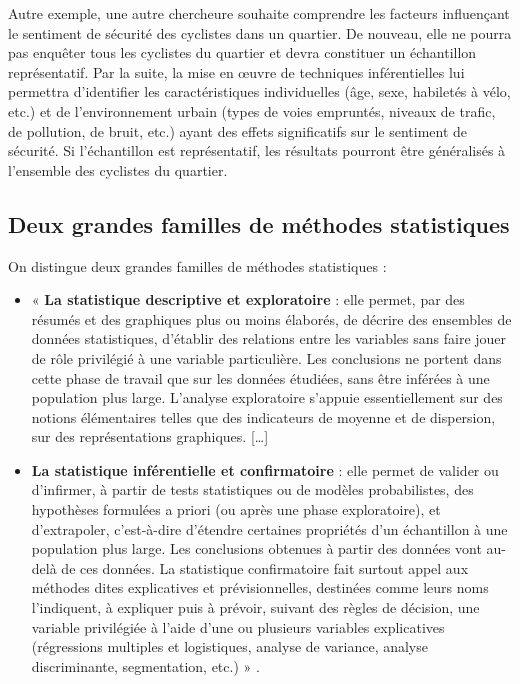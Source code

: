 \documentclass[
  11pt,
  french,
]{book}
\providecommand{\tightlist}{%
  \setlength{\itemsep}{0pt}\setlength{\parskip}{0pt}}
\begin{document}
Autre exemple, une autre chercheure souhaite comprendre les facteurs influençant le sentiment de sécurité des cyclistes dans un quartier. De nouveau, elle ne pourra pas enquêter tous les cyclistes du quartier et devra constituer un échantillon représentatif. Par la suite, la mise en œuvre de techniques inférentielles lui permettra d'identifier les caractéristiques individuelles (âge, sexe, habiletés à vélo, etc.) et de l'environnement urbain (types de voies empruntés, niveaux de trafic, de pollution, de bruit, etc.) ayant des effets significatifs sur le sentiment de sécurité. Si l'échantillon est représentatif, les résultats pourront être généralisés à l'ensemble des cyclistes du quartier.

\hypertarget{sect0232}{%
\subsection{Deux grandes familles de méthodes statistiques}\label{sect0232}}

On distingue deux grandes familles de méthodes statistiques :

\begin{itemize}
\tightlist
\item
  « \textbf{La statistique descriptive et exploratoire} : elle permet, par des résumés et des graphiques plus ou moins élaborés, de décrire des ensembles de données statistiques, d'établir des relations entre les variables sans faire jouer de rôle privilégié à une variable particulière. Les conclusions ne portent dans cette phase de travail que sur les données étudiées, sans être inférées à une population plus large. L'analyse exploratoire s'appuie essentiellement sur des notions élémentaires telles que des indicateurs de moyenne et de dispersion, sur des représentations graphiques. {[}\ldots{]}
\item
  \textbf{La statistique inférentielle et confirmatoire} : elle permet de valider ou d'infirmer, à partir de tests statistiques ou de modèles probabilistes, des hypothèses formulées a priori (ou après une phase exploratoire), et d'extrapoler, c'est-à-dire d'étendre certaines propriétés d'un échantillon à une population plus large. Les conclusions obtenues à partir des données vont au-delà de ces données. La statistique confirmatoire fait surtout appel aux méthodes dites explicatives et prévisionnelles, destinées comme leurs noms l'indiquent, à expliquer puis à prévoir, suivant des règles de décision, une variable privilégiée à l'aide d'une ou plusieurs variables explicatives (régressions multiples et logistiques, analyse de variance, analyse discriminante, segmentation, etc.) » \citep[p.~209]{lebart1995statistique}.
\end{itemize}
\end{document}
